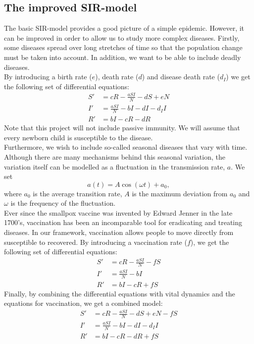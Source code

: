 \documentclass[notitlepage, reprint, nofootinbib]{revtex4-1}
\begin{document}
\subsection{The improved SIR-model}
The basic SIR-model provides a good picture of a simple epidemic. However, it can be improved in order to allow us to study more complex diseases. Firstly, some diseases spread over long stretches of time so that the population change must be taken into account. In addition, we want to be able to include deadly diseases.\\[2mm]
By introducing a birth rate ($e$), death rate ($d$) and disease death rate ($d_I$) we get the following set of differential equations: 
\begin{align}
	S' &= cR-\frac{aSI}{N} - dS + eN\label{SIR2_S}\\
	I' &= \frac{aSI}{N}-bI - dI- d_II\label{SIR2_I}\\
	R' &= bI - cR - dR\label{SIR2_R}
\end{align}
Note that this project will not include passive immunity. We will assume that every newborn child is susceptible to the disease.\\[2mm]
Furthermore, we wish to include so-called seasonal diseases that vary with time. Although there are many mechanisms behind this seasonal variation\cite{seasonal}, the variation itself can be modelled as a fluctuation in the transmission rate, $a$. We set
\begin{equation}a(t)=A\cos(\omega t)+a_0,\end{equation}
where $a_0$ is the average transition rate, $A$ is the maximum deviation from $a_0$ and $\omega$ is the frequency of the fluctuation.\\[2mm]
Ever since the smallpox vaccine was invented by Edward Jenner in the late 1700's\cite{vaccination}, vaccination has been an incomparable tool for eradicating and treating diseases. In our framework, vaccination allows people to move directly from susceptible to recovered. By introducing a vaccination rate ($f$), we get the following set of differential equations:
\begin{align}
	S' &= cR-\frac{aSI}{N} - fS\\
	I' &= \frac{aSI}{N}-bI\\
	R' &= bI - cR + fS
\end{align}
Finally, by combining the differential equations with vital dynamics and the equations for vaccination, we get a combined model:
\begin{align}
	S' &= cR-\frac{aSI}{N} - dS + eN - fS\\
	I' &= \frac{aSI}{N}-bI - dI- d_II\\
	R' &= bI - cR - dR + fS
\end{align}
\end{document}
